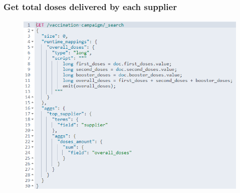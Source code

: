 \documentclass{article}[IEEEtran]
\begin{document}
\newpage

\subsubsection{Get total doses delivered by each supplier}\label{ssec:q11}


\begin{figure}[H]
\begin{center}
\begin{minipage}[b]{0.4\textwidth}
    \includegraphics[width=\textwidth, frame]{Query_5.PNG}
    \subcaption{}
  \end{minipage}
  \hfill
  \begin{minipage}[b]{0.4\textwidth}

\end{minipage}
\end{center}
\end{figure}
\end{document}
